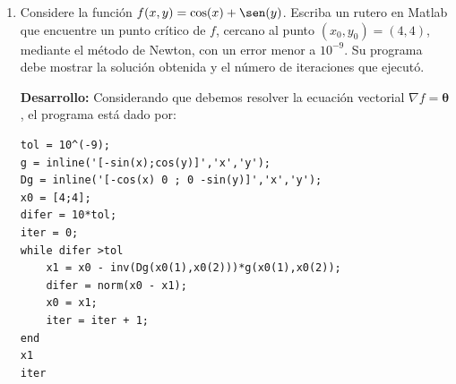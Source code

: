 \documentclass[letter,11pt]{article}
\newcommand{\matlab}{{\sc Matlab} }
\newcommand{\respuesta}[1]{
\noindent\makebox[\textwidth][r]{
\fbox{
\begin{minipage}{\textwidth}
\hfill
\vspace{#1}
\end{minipage}
}}}
\begin{document}
\begin{enumerate}
\begin{enumerate}
\respuesta{2cm}
\end{enumerate}
\textbf{Desarrollo:}  Cada programa viene dado por:
\begin{lstlisting}
function [fnp1,cuociente,err] = fibonacci(n)
fnm1 = 0;
fn = 1;
for i=1:n
    fnp1 = fn + fnm1;
    cuociente = fnp1 / fn;
    fnm1 = fn;
    fn = fnp1;
end
phi = (1 + sqrt(5)) / 2; 
err = abs(cuociente - phi);
\end{lstlisting}

\begin{lstlisting}
N = [1, 10, 100, 1000];
for i = 0:3;
    [fn, cuociente, err] = fibonacci(N(i+1))
end
\end{lstlisting}

La relaci\'on entre el cuociente $f_{n+1}/f_n$ y el n\'umero dorado $\varphi$ est\'a dada por $\displaystyle \lim_{n\to \infty}\dfrac{f_{n+1}}{f_n}=\varphi$. Esto puede ser notado en el decrecimiento de los errores $|f_{n+1}/f_n-\varphi|$ a medida que aumenta $n$

\hfill{}.

\item Considere la funci\'on $f(x,y)=\cos(x)+\sen(y)$. Escriba un rutero en \matlab que encuentre un punto cr\'itico de $f$, cercano al punto $(x_0,y_0)=(4,4)$, mediante el m\'etodo de Newton, con un error menor a $10^{-9}$. Su programa debe mostrar la soluci\'on obtenida y el n\'umero de iteraciones que ejecut\'o.

\textbf{Desarrollo:} Considerando que debemos resolver la ecuaci\'on vectorial $\nabla f = \boldsymbol{\theta}$,  el programa est\'a dado por:

\begin{lstlisting}
tol = 10^(-9);
g = inline('[-sin(x);cos(y)]','x','y');
Dg = inline('[-cos(x) 0 ; 0 -sin(y)]','x','y');
x0 = [4;4];
difer = 10*tol;
iter = 0;
while difer >tol
    x1 = x0 - inv(Dg(x0(1),x0(2)))*g(x0(1),x0(2));
    difer = norm(x0 - x1);
    x0 = x1;
    iter = iter + 1;
end
x1
iter
\end{lstlisting}


\end{enumerate}
\end{document}

